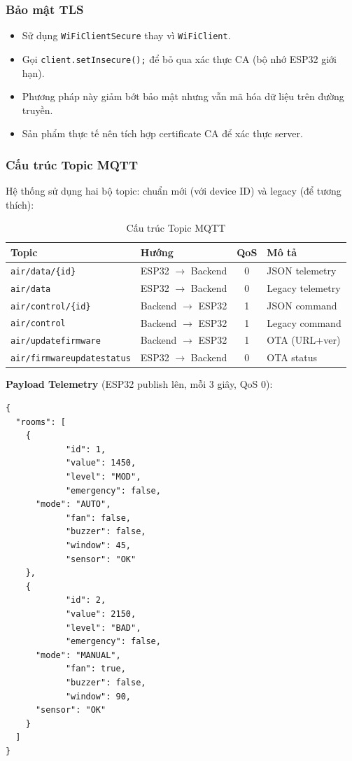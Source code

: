 \documentclass[../BTL_PTIT.tex]{subfiles}
\begin{document}
\subsubsection{Bảo mật TLS}
\begin{itemize}[label=\textbullet]
    \item Sử dụng \texttt{WiFiClientSecure} thay vì \texttt{WiFiClient}.
    \item Gọi \texttt{client.setInsecure();} để bỏ qua xác thực CA (bộ nhớ ESP32 giới hạn).
    \item Phương pháp này giảm bớt bảo mật nhưng vẫn mã hóa dữ liệu trên đường truyền.
    \item Sản phẩm thực tế nên tích hợp certificate CA để xác thực server.
\end{itemize}

\subsubsection{Cấu trúc Topic MQTT}
Hệ thống sử dụng hai bộ topic: chuẩn mới (với device ID) và legacy (để tương thích):

\begin{table}[htbp]
\centering
\caption{Cấu trúc Topic MQTT}
\label{tab:mqtt_topics}
\small
\begin{tabular}{|l|l|c|l|}
\hline
\textbf{Topic} & \textbf{Hướng} & QoS & \textbf{Mô tả} \\
\hline
\texttt{air/data/\{id\}} & ESP32 $\rightarrow$ Backend & 0 & JSON telemetry \\
\hline
\texttt{air/data} & ESP32 $\rightarrow$ Backend & 0 & Legacy telemetry \\
\hline
\texttt{air/control/\{id\}} & Backend $\rightarrow$ ESP32 & 1 & JSON command \\
\hline
\texttt{air/control} & Backend $\rightarrow$ ESP32 & 1 & Legacy command \\
\hline
\texttt{air/updatefirmware} & Backend $\rightarrow$ ESP32 & 1 & OTA (URL+ver) \\
\hline
\texttt{air/firmwareupdatestatus} & ESP32 $\rightarrow$ Backend & 0 & OTA status \\
\hline
\end{tabular}
\end{table}

\textbf{Payload Telemetry} (ESP32 publish lên, mỗi 3 giây, QoS 0):
\begin{lstlisting}[language={}]
{
  "rooms": [
    {
            "id": 1,
            "value": 1450,
            "level": "MOD",
            "emergency": false,
      "mode": "AUTO",
            "fan": false,
            "buzzer": false,
            "window": 45,
            "sensor": "OK"
    },
    {
            "id": 2,
            "value": 2150,
            "level": "BAD",
            "emergency": false,
      "mode": "MANUAL",
            "fan": true,
            "buzzer": false,
            "window": 90,
      "sensor": "OK"
    }
  ]
}
\end{lstlisting}
\end{document}
